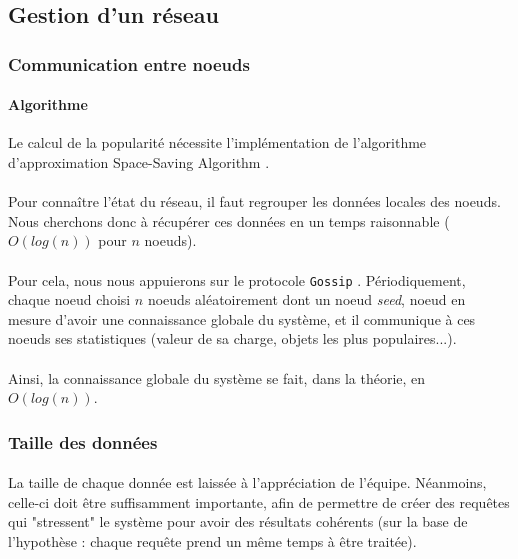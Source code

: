 \documentclass[12pt]{article}
\begin{document}
\subsection{Gestion d'un réseau}

\subsubsection{Communication entre noeuds}

\paragraph{Algorithme} Le calcul de la popularité nécessite l'implémentation de l'algorithme d'approximation Space-Saving Algorithm \cite{SpaceSaving}.

\paragraph{}Pour connaître l'état du réseau, il faut regrouper les données locales des noeuds.
Nous cherchons donc à récupérer ces données en un temps raisonnable ($O(log(n))$ pour $n$ noeuds).

\paragraph{}Pour cela, nous nous appuierons sur le protocole \texttt{Gossip} \cite{gossip}.
Périodiquement, chaque noeud choisi $n$ noeuds aléatoirement dont un noeud \textit{seed}\cite{seed}, noeud en mesure d'avoir une connaissance globale du système, et il communique à ces noeuds ses statistiques (valeur de sa charge, objets les plus populaires...).

\paragraph{}Ainsi, la connaissance globale du système se fait, dans la théorie, en $O(log(n))$.


\subsubsection{Taille des données}

\paragraph{} La taille de chaque donnée est laissée à l'appréciation de l'équipe. 
Néanmoins, celle-ci doit être suffisamment importante, afin de permettre de créer des requêtes qui "stressent" le système pour avoir des résultats cohérents (sur la base de l'hypothèse : chaque requête prend un même temps à être traitée).
\end{document}
